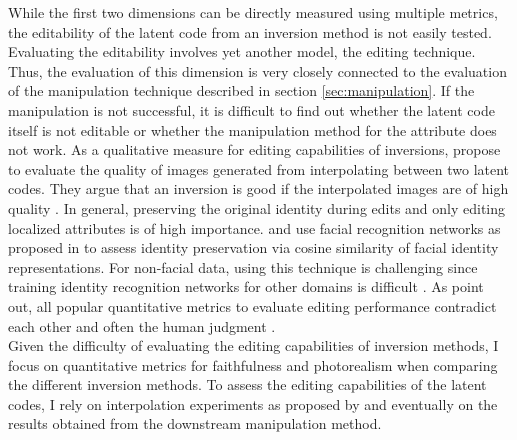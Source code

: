 While the first two dimensions can be directly measured using multiple metrics, the editability of the latent code from an inversion method is not easily tested. Evaluating the editability involves yet another model, the editing technique. Thus, the evaluation of this dimension is very closely connected to the evaluation of the manipulation technique described in section \ref{sec:manipulation}. If the manipulation is not successful, it is difficult to find out whether the latent code itself is not editable or whether the manipulation method for the attribute does not work. As a qualitative measure for editing capabilities of inversions, \cite{zhu2020improved} propose to evaluate the quality of images generated from interpolating between two latent codes. They argue that an inversion is good if the interpolated images are of high quality \citep[p.10]{zhu2020improved}. In general, preserving the original identity during edits and only editing localized attributes is of high importance. \cite{alaluf2021only} and \cite{richardson2021encoding} use facial recognition networks as proposed in \citep{deng2019arcface} to assess identity preservation via cosine similarity of facial identity representations. For non-facial data, using this technique is challenging since training identity recognition networks for other domains is difficult \citep[p.13]{bermano2022state}. As \cite{tov2021designing} point out, all popular quantitative metrics to evaluate editing performance contradict each other and often the human judgment \citep[p.7]{tov2021designing}. \\
Given the difficulty of evaluating the editing capabilities of inversion methods, I focus on quantitative metrics for faithfulness and photorealism when comparing the different inversion methods. To assess the editing capabilities of the latent codes, I rely on interpolation experiments as proposed by \citep{zhu2020improved} and eventually on the results obtained from the downstream manipulation method.